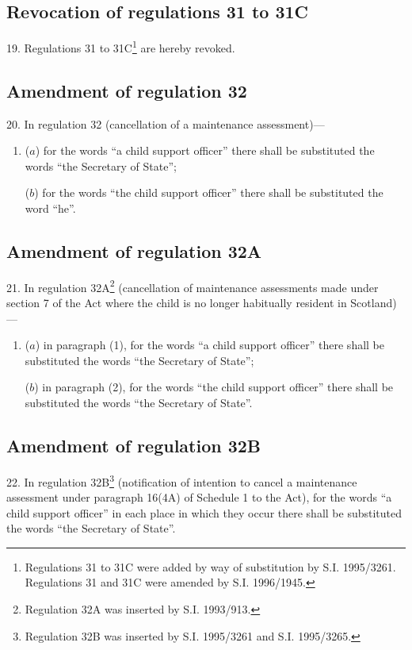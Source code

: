 \documentclass[12pt,a4paper]{article}
\begin{document}
\subsection[19. Revocation of regulations 31 to 31C]{Revocation of regulations 31 to 31C}

19.  Regulations 31 to 31C\footnote{\frenchspacing Regulations 31 to 31C were added by way of substitution by S.I. 1995/3261. Regulations 31 and 31C were amended by S.I. 1996/1945.} are hereby revoked.

\subsection[20. Amendment of regulation 32]{Amendment of regulation 32}

20.  In regulation 32 (cancellation of a maintenance assessment)---
\begin{enumerate}\item[]
($a$) for the words “a child support officer” there shall be substituted the words “the Secretary of State”;

($b$) for the words “the child support officer” there shall be substituted the word “he”.
\end{enumerate}

\subsection[21. Amendment of regulation 32A]{Amendment of regulation 32A}

21.  In regulation 32A\footnote{\frenchspacing Regulation 32A was inserted by S.I. 1993/913.} (cancellation of maintenance assessments made under section 7 of the Act where the child is no longer habitually resident in Scotland)---
\begin{enumerate}\item[]
($a$) in paragraph (1), for the words “a child support officer” there shall be substituted the words “the Secretary of State”;

($b$) in paragraph (2), for the words “the child support officer” there shall be substituted the words “the Secretary of State”.
\end{enumerate}

\subsection[22. Amendment of regulation 32B]{Amendment of regulation 32B}

22.  In regulation 32B\footnote{\frenchspacing Regulation 32B was inserted by S.I. 1995/3261 and S.I. 1995/3265.} (notification of intention to cancel a maintenance assessment under paragraph 16(4A) of Schedule 1 to the Act), for the words “a child support officer” in each place in which they occur there shall be substituted the words “the Secretary of State”.
\end{document}
